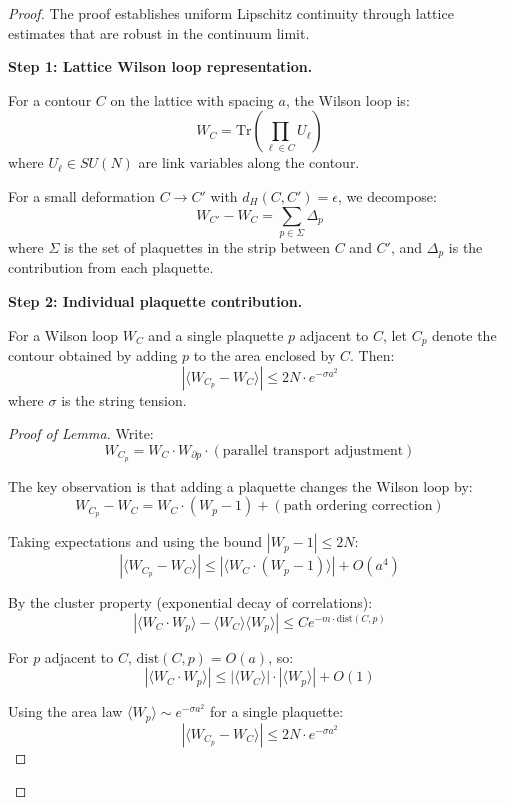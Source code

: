 \begin{proof}
The proof establishes uniform Lipschitz continuity through lattice estimates 
that are robust in the continuum limit.

\textbf{Step 1: Lattice Wilson loop representation.}

For a contour $C$ on the lattice with spacing $a$, the Wilson loop is:
\[
W_C = \text{Tr}\left(\prod_{\ell \in C} U_\ell\right)
\]
where $U_\ell \in SU(N)$ are link variables along the contour.

For a small deformation $C \to C'$ with $d_H(C, C') = \epsilon$, we decompose:
\[
W_{C'} - W_C = \sum_{p \in \Sigma} \Delta_p
\]
where $\Sigma$ is the set of plaquettes in the strip between $C$ and $C'$, and 
$\Delta_p$ is the contribution from each plaquette.

\textbf{Step 2: Individual plaquette contribution.}

\begin{lemma}
\label{lem:plaquette-increment}
For a Wilson loop $W_C$ and a single plaquette $p$ adjacent to $C$, let $C_p$ 
denote the contour obtained by adding $p$ to the area enclosed by $C$. Then:
\[
|\langle W_{C_p} - W_C \rangle| \leq 2N \cdot e^{-\sigma a^2}
\]
where $\sigma$ is the string tension.
\end{lemma}

\begin{proof}[Proof of Lemma]
Write:
\[
W_{C_p} = W_C \cdot W_{\partial p} \cdot (\text{parallel transport adjustment})
\]

The key observation is that adding a plaquette changes the Wilson loop by:
\[
W_{C_p} - W_C = W_C \cdot (W_p - 1) + (\text{path ordering correction})
\]

Taking expectations and using the bound $|W_p - 1| \leq 2N$:
\[
|\langle W_{C_p} - W_C \rangle| \leq |\langle W_C \cdot (W_p - 1) \rangle| + O(a^4)
\]

By the cluster property (exponential decay of correlations):
\[
|\langle W_C \cdot W_p \rangle - \langle W_C \rangle \langle W_p \rangle| 
\leq C e^{-m \cdot \text{dist}(C, p)}
\]

For $p$ adjacent to $C$, $\text{dist}(C, p) = O(a)$, so:
\[
|\langle W_C \cdot W_p \rangle| \leq |\langle W_C \rangle| \cdot |\langle W_p \rangle| + O(1)
\]

Using the area law $\langle W_p \rangle \sim e^{-\sigma a^2}$ for a single plaquette:
\[
|\langle W_{C_p} - W_C \rangle| \leq 2N \cdot e^{-\sigma a^2}
\]
\end{proof}


\end{proof}
